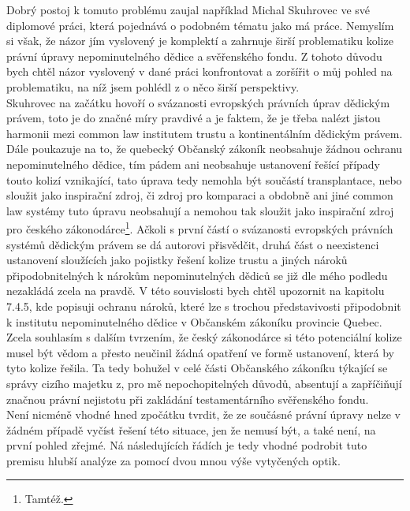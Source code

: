 \documentclass{article}
\begin{document}
Dobrý postoj k tomuto problému zaujal například Michal Skuhrovec ve své diplomové práci, která pojednává o podobném tématu jako má práce. Nemyslím si však, že názor jím vyslovený je komplektí a zahrnuje širší problematiku kolize právní úpravy nepominutelného dědice a svěřenského fondu. Z tohoto důvodu bych chtěl názor vyslovený v dané práci konfrontovat a zoršířit o můj pohled na problematiku, na níž jsem pohlédl z o něco širší perspektivy.\\

Skuhrovec na začátku hovoří o svázanosti evropských právních úprav dědickým právem, toto je do značné míry pravdivé a je faktem, že je třeba nalézt jistou harmonii mezi common law institutem trustu a kontinentálním dědickým právem. Dále poukazuje na to, že quebecký Občanský zákoník neobsahuje žádnou ochranu nepominutelného dědice, tím pádem ani neobsahuje ustanovení řešící případy touto kolizí vznikající, tato úprava tedy nemohla být součástí transplantace, nebo sloužit jako inspirační zdroj, či zdroj pro komparaci a obdobně ani jiné common law systémy tuto úpravu neobsahují a nemohou tak sloužit jako inspirační zdroj pro českého zákonodárce\footnote{Tamtéž.}. Ačkoli s první částí o svázanosti evropských právních systémů dědickým právem se dá autorovi přisvědčit, druhá část o neexistenci ustanovení sloužících jako pojistky řešení kolize trustu a jiných nároků připodobnitelných k nárokům nepominutelných dědiců se již dle mého podledu nezakládá zcela na pravdě. V této souvislosti bych chtěl upozornit na kapitolu 7.4.5, kde popisuji ochranu nároků, které lze s trochou představivosti připodobnit k institutu nepominutelného dědice v Občanském zákoníku provincie Quebec.\\

Zcela souhlasím s dalším tvrzením, že český zákonodárce si této potenciální kolize musel být vědom a přesto neučinil žádná opatření ve formě ustanovení, která by tyto kolize řešila. Ta tedy bohužel v celé části Občanského zákoníku týkající se správy cizího majetku z, pro mě nepochopitelných důvodů, absentují a zapříčiňují značnou právní nejistotu při zakládání testamentárního svěřenského fondu.\\

Není nicméně vhodné hned zpočátku tvrdit, že ze součásné právní úpravy nelze v žádném případě vyčíst řešení této situace, jen že nemusí být, a také není, na první pohled zřejmé. Ná následujících řádích je tedy vhodné podrobit tuto premisu hlubší analýze za pomocí dvou mnou výše vytyčených optik.\\
\end{document}
